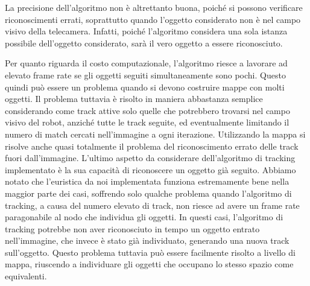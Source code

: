 La precisione dell'algoritmo non è altrettanto buona, poiché si possono
verificare riconoscimenti errati, soprattutto quando l'oggetto considerato non è nel campo visivo della telecamera. Infatti, poiché l'algoritmo considera una sola istanza possibile dell'oggetto considerato, sarà il vero oggetto a essere riconosciuto.

Per quanto riguarda il costo computazionale, l'algoritmo riesce a lavorare ad elevato frame rate se gli oggetti seguiti simultaneamente sono pochi. Questo quindi può essere un problema quando si devono costruire mappe con molti oggetti. Il problema tuttavia è risolto in maniera abbastanza semplice considerando come track attive solo quelle che potrebbero trovarsi nel campo visivo del robot, anziché tutte le track seguite, ed eventualmente limitando il numero di match cercati nell'immagine a ogni iterazione. Utilizzando la mappa si risolve anche quasi totalmente il problema del riconoscimento errato delle track fuori dall'immagine.
L'ultimo aspetto da considerare dell'algoritmo di tracking implementato è la sua capacità di riconoscere un oggetto già seguito.
Abbiamo notato che l'euristica da noi implementata funziona estremamente bene nella maggior parte dei casi, soffrendo solo qualche problema quando l'algoritmo di tracking, a causa del numero elevato di track, non riesce ad avere un frame rate paragonabile al nodo che individua gli oggetti. In questi casi, l'algoritmo di tracking potrebbe non aver riconosciuto in tempo un oggetto entrato nell'immagine, che invece è stato già individuato, generando una nuova track sull'oggetto. Questo problema tuttavia può essere facilmente risolto a livello di mappa, riuscendo a individuare gli oggetti che occupano lo stesso spazio come equivalenti.
